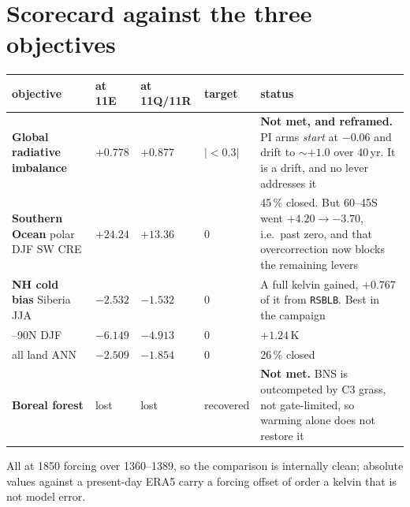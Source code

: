 \documentclass[10pt]{article}
\begin{document}
\section{Scorecard against the three objectives}\label{sec:score}
\begin{center}\small
\begin{tabular}{p{} p{} p{} p{} p{}}
\toprule
objective & at 11E & at 11Q/11R & target & status \\
\midrule
\textbf{Global radiative imbalance} & $+0.778$ & $+0.877$ & $|{<}0.3|$ &
\textbf{Not met, and reframed.} PI arms \emph{start} at $-0.06$ and drift to ${\sim}+1.0$
over 40\,yr. It is a drift, and no lever addresses it \\
\addlinespace
\textbf{Southern Ocean} polar DJF SW CRE & $+24.24$ & $+13.36$ & $0$ &
45\,\% closed. But 60--45S went $+4.20\to-3.70$, i.e.\ past zero, and that overcorrection
now blocks the remaining levers \\
\addlinespace
\textbf{NH cold bias} Siberia JJA & $-2.532$ & $-1.532$ & $0$ &
A full kelvin gained, $+0.767$ of it from \texttt{RSBLB}. Best in the campaign \\
\quad 60--90N DJF & $-6.149$ & $-4.913$ & $0$ & $+1.24$\,K \\
\quad all land ANN & $-2.509$ & $-1.854$ & $0$ & 26\,\% closed \\
\addlinespace
\textbf{Boreal forest} & lost & lost & recovered &
\textbf{Not met.} BNS is outcompeted by C3 grass, not gate-limited, so warming alone does
not restore it \\
\bottomrule
\end{tabular}
\end{center}

All at 1850 forcing over 1360--1389, so the comparison is internally clean; absolute values
against a present-day ERA5 carry a forcing offset of order a kelvin that is not model
error.
\end{document}

